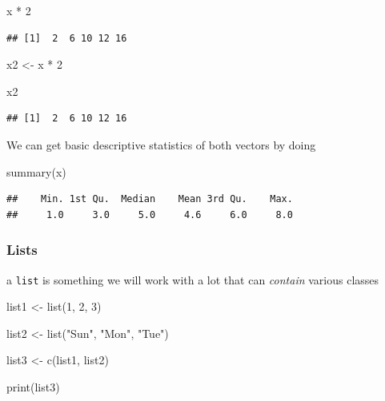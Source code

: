 \documentclass[]{tufte-handout}
\newenvironment{Shaded}{}{}
\newcommand{\DecValTok}[1]{\textcolor[rgb]{0.25,0.63,0.44}{#1}}
\newcommand{\FunctionTok}[1]{\textcolor[rgb]{0.02,0.16,0.49}{#1}}
\newcommand{\NormalTok}[1]{#1}
\newcommand{\OtherTok}[1]{\textcolor[rgb]{0.00,0.44,0.13}{#1}}
\newcommand{\SpecialCharTok}[1]{\textcolor[rgb]{0.25,0.44,0.63}{#1}}
\newcommand{\StringTok}[1]{\textcolor[rgb]{0.25,0.44,0.63}{#1}}
\begin{document}
\begin{Shaded}
\begin{Highlighting}[]
\NormalTok{x }\SpecialCharTok{*} \DecValTok{2}
\end{Highlighting}
\end{Shaded}

\begin{verbatim}
## [1]  2  6 10 12 16
\end{verbatim}

\begin{Shaded}
\begin{Highlighting}[]
\NormalTok{x2 }\OtherTok{\textless{}{-}}\NormalTok{ x }\SpecialCharTok{*} \DecValTok{2}

\NormalTok{x2}
\end{Highlighting}
\end{Shaded}

\begin{verbatim}
## [1]  2  6 10 12 16
\end{verbatim}

We can get basic descriptive statistics of both vectors by doing

\begin{Shaded}
\begin{Highlighting}[]
\FunctionTok{summary}\NormalTok{(x)}
\end{Highlighting}
\end{Shaded}

\begin{verbatim}
##    Min. 1st Qu.  Median    Mean 3rd Qu.    Max. 
##     1.0     3.0     5.0     4.6     6.0     8.0
\end{verbatim}

\hypertarget{lists}{%
\subsubsection{Lists}\label{lists}}

a \texttt{list} is something we will work with a lot that can
\emph{contain} various classes

\begin{Shaded}
\begin{Highlighting}[]
\NormalTok{list1 }\OtherTok{\textless{}{-}} \FunctionTok{list}\NormalTok{(}\DecValTok{1}\NormalTok{, }\DecValTok{2}\NormalTok{, }\DecValTok{3}\NormalTok{)}

\NormalTok{list2 }\OtherTok{\textless{}{-}} \FunctionTok{list}\NormalTok{(}\StringTok{"Sun"}\NormalTok{, }\StringTok{"Mon"}\NormalTok{, }\StringTok{"Tue"}\NormalTok{)}

\NormalTok{list3 }\OtherTok{\textless{}{-}} \FunctionTok{c}\NormalTok{(list1, list2)}

\FunctionTok{print}\NormalTok{(list3)}
\end{Highlighting}
\end{Shaded}
\end{document}
